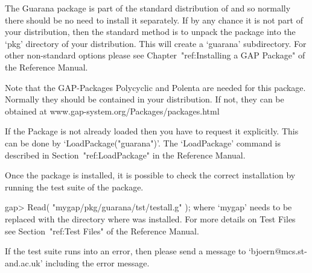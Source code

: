 
\null

The Guarana package is part of the standard distribution of {\GAP} and
so normally there should be no need to install it separately.
If by any chance it is not part of your {\GAP} distribution, then 
the standard method is to unpack	 the package into the `pkg'
directory  of your {\GAP} distribution.  This will create a `guarana'
subdirectory. 
For other non-standard options please see  Chapter~"ref:Installing a
GAP Package" of the {\GAP} Reference Manual.

Note that the GAP-Packages Polycyclic and Polenta
are needed for this package.
Normally they should be contained in your distribution. If not, 
they can be obtained at
\begintt
               www.gap-system.org/Packages/packages.html             

\endtt





\null

If the {\Guarana} Package is not already loaded 
then you have to request it explicitly. 
This  can be 
done by `LoadPackage("guarana")'.
The `LoadPackage' command is described in Section~"ref:LoadPackage"
in the {\GAP} Reference Manual.


    Once the package is installed, it is possible to check the correct
    installation by running the test suite of the package.

\beginexample
    gap> Read( "mygap/pkg/guarana/tst/testall.g" );
\endexample
    where `mygap' needs to be replaced with the directory where {\GAP}
    was installed. For more details on  Test Files see 
    Section~"ref:Test Files" of the 
    {\GAP} Reference Manual.

    If the test suite runs into an error, 
    then please send a message
    to `bjoern@mcs.st-and.ac.uk' including the error message.



